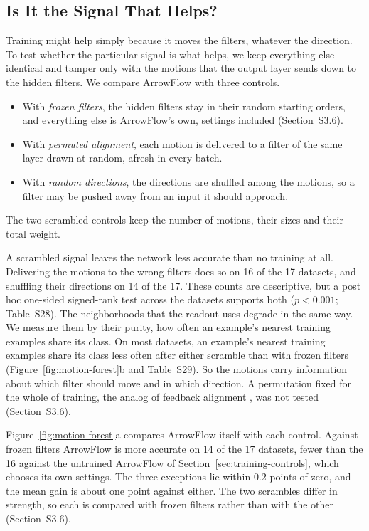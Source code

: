 \subsection{Is It the Signal That Helps?}\label{sec:motion-controls}

Training might help simply because it moves the filters, whatever the direction. To test whether the particular signal is what helps, we keep everything else identical and tamper only with the motions that the output layer sends down to the hidden filters. We compare ArrowFlow with three controls.
\begin{itemize}[leftmargin=2em,topsep=2pt,itemsep=1pt]
\item With \emph{frozen filters}, the hidden filters stay in their random starting orders, and everything else is ArrowFlow's own, settings included (Section~S3.6).
\item With \emph{permuted alignment}, each motion is delivered to a filter of the same layer drawn at random, afresh in every batch.
\item With \emph{random directions}, the directions are shuffled among the motions, so a filter may be pushed away from an input it should approach.
\end{itemize}
The two scrambled controls keep the number of motions, their sizes and their total weight.



A scrambled signal leaves the network less accurate than no training at all. Delivering the motions to the wrong filters does so on 16 of the 17 datasets, and shuffling their directions on 14 of the 17. These counts are descriptive, but a post hoc one-sided signed-rank test across the datasets supports both ($p<0.001$; Table~S28). The neighborhoods that the readout uses degrade in the same way. We measure them by their purity, how often an example's nearest training examples share its class. On most datasets, an example's nearest training examples share its class less often after either scramble than with frozen filters (Figure~\ref{fig:motion-forest}b and Table~S29). So the motions carry information about which filter should move and in which direction. A permutation fixed for the whole of training, the analog of feedback alignment \citep{lillicrap2016random}, was not tested (Section~S3.6).

Figure~\ref{fig:motion-forest}a compares ArrowFlow itself with each control. Against frozen filters ArrowFlow is more accurate on 14 of the 17 datasets, fewer than the 16 against the untrained ArrowFlow of Section~\ref{sec:training-controls}, which chooses its own settings. The three exceptions lie within 0.2 points of zero, and the mean gain is about one point against either. The two scrambles differ in strength, so each is compared with frozen filters rather than with the other (Section~S3.6).

